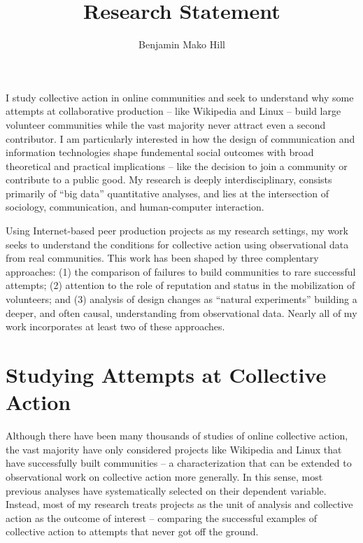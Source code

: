 \documentclass[10pt]{memoir}
\begin{document}
\setlength{\parskip}{4.5pt}

\baselineskip 14.5pt

\title{Research Statement}
\author{Benjamin Mako Hill}

\maketitle

I study collective action in online communities and seek to understand
why some attempts at collaborative production -- like Wikipedia and
Linux -- build large volunteer communities while the vast majority
never attract even a second contributor. I am particularly interested
in how the design of communication and information technologies shape
fundemental social outcomes with broad theoretical and practical
implications -- like the decision to join a community or contribute to
a public good. My research is deeply interdisciplinary, consists
primarily of ``big data'' quantitative analyses, and lies at the
intersection of sociology, communication, and human-computer
interaction.

Using Internet-based peer production projects as my research settings,
my work seeks to understand the conditions for collective action using
observational data from real communities.  This work has been shaped
by three complentary approaches: (1) the comparison of failures to
build communities to rare successful attempts; (2) attention to the
role of reputation and status in the mobilization of volunteers; and
(3) analysis of design changes as ``natural experiments'' building a
deeper, and often causal, understanding from observational
data. Nearly all of my work incorporates at least two of these
approaches.

\section{Studying Attempts at Collective Action}

Although there have been many thousands of studies of online
collective action, the vast majority have only considered projects
like Wikipedia and Linux that have successfully built communities -- a
characterization that can be extended to observational work on
collective action more generally. In this sense, most previous
analyses have systematically selected on their dependent
variable. Instead, most of my research treats projects as the unit of
analysis and collective action as the outcome of interest -- comparing
the successful examples of collective action to attempts that never
got off the ground.
\end{document}
